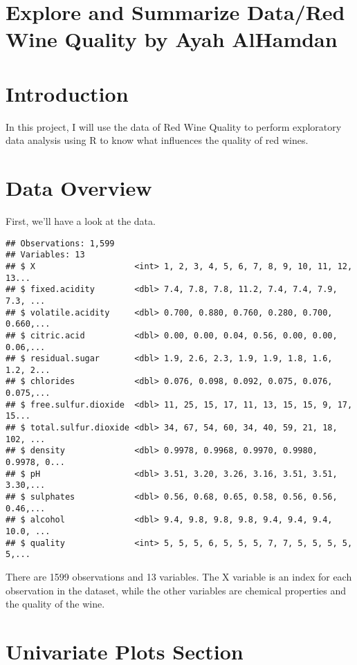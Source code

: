 \documentclass[]{article}
\title{}
\author{}
\date{}
\begin{document}
\section{Explore and Summarize Data/Red Wine Quality by Ayah
AlHamdan}\label{explore-and-summarize-datared-wine-quality-by-ayah-alhamdan}

\section{Introduction}\label{introduction}

In this project, I will use the data of Red Wine Quality to perform
exploratory data analysis using R to know what influences the quality of
red wines.

\section{Data Overview}\label{data-overview}

First, we'll have a look at the data.

\begin{verbatim}
## Observations: 1,599
## Variables: 13
## $ X                    <int> 1, 2, 3, 4, 5, 6, 7, 8, 9, 10, 11, 12, 13...
## $ fixed.acidity        <dbl> 7.4, 7.8, 7.8, 11.2, 7.4, 7.4, 7.9, 7.3, ...
## $ volatile.acidity     <dbl> 0.700, 0.880, 0.760, 0.280, 0.700, 0.660,...
## $ citric.acid          <dbl> 0.00, 0.00, 0.04, 0.56, 0.00, 0.00, 0.06,...
## $ residual.sugar       <dbl> 1.9, 2.6, 2.3, 1.9, 1.9, 1.8, 1.6, 1.2, 2...
## $ chlorides            <dbl> 0.076, 0.098, 0.092, 0.075, 0.076, 0.075,...
## $ free.sulfur.dioxide  <dbl> 11, 25, 15, 17, 11, 13, 15, 15, 9, 17, 15...
## $ total.sulfur.dioxide <dbl> 34, 67, 54, 60, 34, 40, 59, 21, 18, 102, ...
## $ density              <dbl> 0.9978, 0.9968, 0.9970, 0.9980, 0.9978, 0...
## $ pH                   <dbl> 3.51, 3.20, 3.26, 3.16, 3.51, 3.51, 3.30,...
## $ sulphates            <dbl> 0.56, 0.68, 0.65, 0.58, 0.56, 0.56, 0.46,...
## $ alcohol              <dbl> 9.4, 9.8, 9.8, 9.8, 9.4, 9.4, 9.4, 10.0, ...
## $ quality              <int> 5, 5, 5, 6, 5, 5, 5, 7, 7, 5, 5, 5, 5, 5,...
\end{verbatim}

There are 1599 observations and 13 variables. The X variable is an index
for each observation in the dataset, while the other variables are
chemical properties and the quality of the wine.

\section{Univariate Plots Section}\label{univariate-plots-section}
\end{document}
